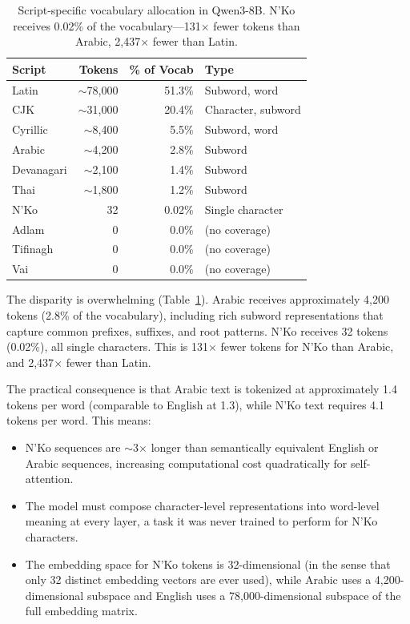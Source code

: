 \documentclass[11pt]{article}
\begin{document}
\begin{table}[t]
\centering
\small
\begin{tabular}{lrrl}
\toprule
\textbf{Script} & \textbf{Tokens} & \textbf{\% of Vocab} & \textbf{Type} \\
\midrule
Latin & ${\sim}$78,000 & 51.3\% & Subword, word \\
CJK & ${\sim}$31,000 & 20.4\% & Character, subword \\
Cyrillic & ${\sim}$8,400 & 5.5\% & Subword, word \\
Arabic & ${\sim}$4,200 & 2.8\% & Subword \\
Devanagari & ${\sim}$2,100 & 1.4\% & Subword \\
Thai & ${\sim}$1,800 & 1.2\% & Subword \\
\midrule
N'Ko & 32 & 0.02\% & Single character \\
Adlam & 0 & 0.0\% & (no coverage) \\
Tifinagh & 0 & 0.0\% & (no coverage) \\
Vai & 0 & 0.0\% & (no coverage) \\
\bottomrule
\end{tabular}
\caption{Script-specific vocabulary allocation in Qwen3-8B. N'Ko receives 0.02\% of the vocabulary---131$\times$ fewer tokens than Arabic, 2,437$\times$ fewer than Latin.}
\label{tab:vocab-allocation}
\end{table}

The disparity is overwhelming (Table~\ref{tab:vocab-allocation}).
Arabic receives approximately 4,200 tokens (2.8\% of the vocabulary), including rich subword representations that capture common prefixes, suffixes, and root patterns.
N'Ko receives 32 tokens (0.02\%), all single characters.
This is 131$\times$ fewer tokens for N'Ko than Arabic, and 2,437$\times$ fewer than Latin.

The practical consequence is that Arabic text is tokenized at approximately 1.4 tokens per word (comparable to English at 1.3), while N'Ko text requires 4.1 tokens per word.
This means:
\begin{itemize}
\item N'Ko sequences are $\sim$3$\times$ longer than semantically equivalent English or Arabic sequences, increasing computational cost quadratically for self-attention.
\item The model must compose character-level representations into word-level meaning at every layer, a task it was never trained to perform for N'Ko characters.
\item The embedding space for N'Ko tokens is 32-dimensional (in the sense that only 32 distinct embedding vectors are ever used), while Arabic uses a 4,200-dimensional subspace and English uses a 78,000-dimensional subspace of the full embedding matrix.
\end{itemize}
\end{document}
